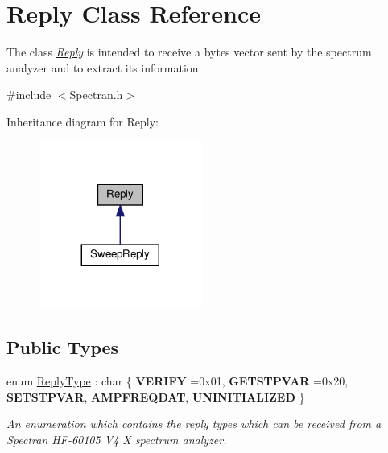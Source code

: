\hypertarget{classReply}{}\section{Reply Class Reference}
\label{classReply}


The class {\itshape \hyperlink{classReply}{Reply}} is intended to receive a bytes vector sent by the spectrum analyzer and to extract its information.  




{\ttfamily \#include $<$Spectran.\+h$>$}



Inheritance diagram for Reply\+:
\nopagebreak
\begin{figure}[H]
\begin{center}
\leavevmode
\includegraphics[width=152pt]{classReply__inherit__graph}
\end{center}
\end{figure}
\subsection*{Public Types}
\begin{DoxyCompactItemize}
\item 
enum \hyperlink{classReply_aa873dec4817ed08a5212ec3ba2b5c807}{Reply\+Type} \+: char \{ \newline
{\bfseries V\+E\+R\+I\+FY} =0x01, 
{\bfseries G\+E\+T\+S\+T\+P\+V\+AR} =0x20, 
{\bfseries S\+E\+T\+S\+T\+P\+V\+AR}, 
{\bfseries A\+M\+P\+F\+R\+E\+Q\+D\+AT}, 
\newline
{\bfseries U\+N\+I\+N\+I\+T\+I\+A\+L\+I\+Z\+ED}
 \}\begin{DoxyCompactList}\small\item\em An enumeration which contains the reply types which can be received from a Spectran H\+F-\/60105 V4 X spectrum analyzer. \end{DoxyCompactList}
\end{DoxyCompactItemize}
